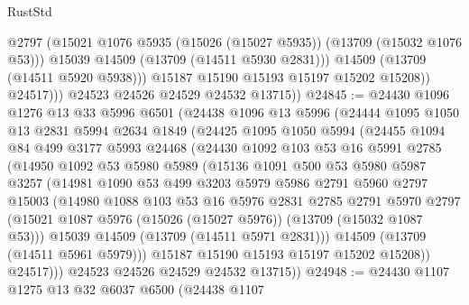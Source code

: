\begin{lexlean}{RustStd}
\begin{coremodule}
                      @2797
                      (@15021 @1076 @5935 (@15026 (@15027 @5935)) (@13709 (@15032 @1076 @53)))
                      @15039
                      @14509
                      (@13709 (@14511 @5930 @2831)))
                    @14509
                    (@13709 (@14511 @5920 @5938)))
                  @15187
                  @15190
                  @15193
                  @15197
                  @15202
                  @15208))
              @24517)))
        @24523
        @24526
        @24529
        @24532
        @13715))
@24845 := @24430
    @1096
    @1276
    @13
    @33
    @5996
    @6501
    (@24438
      @1096
      @13
      @5996
      (@24444
        @1095
        @1050
        @13
        @2831
        @5994
        @2634
        @1849
        (@24425
          @1095
          @1050
          @5994
          (@24455
            @1094
            @84
            @499
            @3177
            @5993
            @24468
            (@24430
              @1092
              @103
              @53
              @16
              @5991
              @2785
              (@14950
                @1092
                @53
                @5980
                @5989
                (@15136
                  @1091
                  @500
                  @53
                  @5980
                  @5987
                  @3257
                  (@14981
                    @1090
                    @53
                    @499
                    @3203
                    @5979
                    @5986
                    @2791
                    @5960
                    @2797
                    @15003
                    (@14980
                      @1088
                      @103
                      @53
                      @16
                      @5976
                      @2831
                      @2785
                      @2791
                      @5970
                      @2797
                      (@15021 @1087 @5976 (@15026 (@15027 @5976)) (@13709 (@15032 @1087 @53)))
                      @15039
                      @14509
                      (@13709 (@14511 @5971 @2831)))
                    @14509
                    (@13709 (@14511 @5961 @5979)))
                  @15187
                  @15190
                  @15193
                  @15197
                  @15202
                  @15208))
              @24517)))
        @24523
        @24526
        @24529
        @24532
        @13715))
@24948 := @24430
    @1107
    @1275
    @13
    @32
    @6037
    @6500
    (@24438
      @1107

\end{coremodule}
\end{lexlean}
